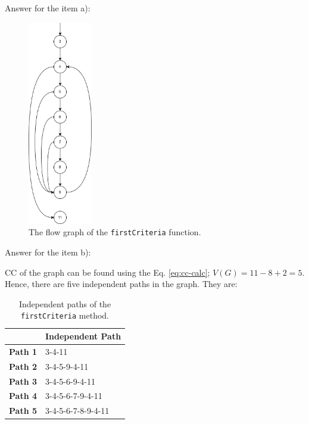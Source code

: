 \begin{solution}
    Answer for the item a):
    
    \begin{figure}[H]
        \centering
        \includegraphics[width=0.25\textwidth]{images/exercise-8a-solution.png}
        \caption{The flow graph of the \lstinline!firstCriteria! function.}
        \label{fig:ex8-fg}
    \end{figure}
    
    Answer for the item b):
    
    CC of the graph can be found using the Eq. \ref{eq:cc-calc}; $V(G) = 11 - 8 + 2 = 5$. Hence, there are five independent paths in the graph. They are:
    \begin{table}[H]
        \centering
        \renewcommand{\arraystretch}{1.2}
        \caption{Independent paths of the \lstinline!firstCriteria! method.}
        \label{tab:ex8-indep-paths}
        \begin{tabularx}{\textwidth}{lX}
            \toprule
             & Independent Path\\
             \midrule
            \textbf{Path 1} & 3-4-11\\
            \textbf{Path 2} & 3-4-5-9-4-11\\
            \textbf{Path 3} & 3-4-5-6-9-4-11\\
            \textbf{Path 4} & 3-4-5-6-7-9-4-11\\
            \textbf{Path 5} & 3-4-5-6-7-8-9-4-11\\
            \bottomrule
        \end{tabularx}
    \end{table}
    

\end{solution}
